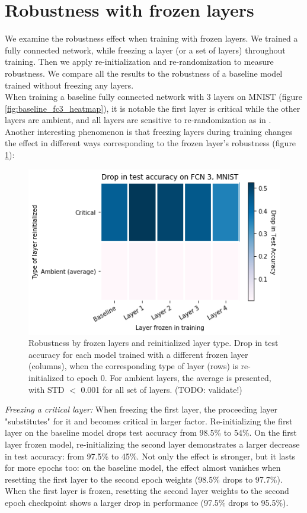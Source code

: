 \documentclass{article}
\begin{document}
\section{Robustness with frozen layers}
We examine the robustness effect when training with frozen layers. We trained a fully connected network, while freezing a layer (or a set of layers) throughout training. Then we apply re-initialization and re-randomization to measure robustness. We compare all the results to the robustness of a baseline model trained without freezing any layers.\\
When training a baseline fully connected network with 3 layers on MNIST (figure \ref{fig:baseline_fc3_heatmap}), it is notable the first layer is critical while the other layers are ambient, and all layers are sensitive to re-randomization as in \cite{allLayers}.\\
Another interesting phenomenon is that freezing layers during training changes the effect in different ways corresponding to the frozen layer's robustness (figure \ref{fig:fc3_drop_by_layer_type}):\\ 
\begin{figure}
  \includegraphics[width=\linewidth]{images/fc3_mnist_drop_in_acc_by_layer.png}
  \caption{Robustness by frozen layers and reinitialized layer type. Drop in test accuracy for each model trained with a different frozen layer (columns), when the corresponding type of layer (rows) is re-initialized to epoch 0. For ambient layers, the average is presented, with STD $<$ 0.001 for all set of layers. (TODO: validate!)}
  \label{fig:fc3_drop_by_layer_type}
\end{figure}
\emph{Freezing a critical layer:} When freezing the first layer, the proceeding layer "substitutes" for it and becomes critical in larger factor. Re-initializing the first layer on the baseline model drops test accuracy from 98.5\% to 54\%. On the first layer frozen model, re-initializing the second layer demonstrates a larger decrease in test accuracy: from 97.5\% to 45\%. Not only the effect is stronger, but it lasts for more epochs too: on the baseline model, the effect almost vanishes when resetting the first layer to the second epoch weights (98.5\% drops to 97.7\%). When the first layer is frozen, resetting the second layer weights to the second epoch checkpoint shows a larger drop in performance (97.5\% drops to 95.5\%).\\
\end{document}
